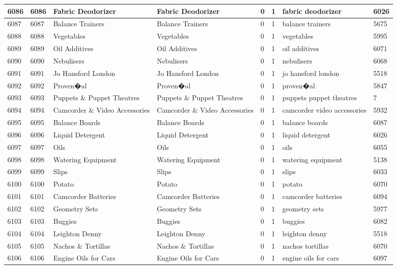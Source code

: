 \begin{longtable}{|l|l|l|l|l|l|l|l|}
6086 & 6086 & Fabric Deodorizer & Fabric Deodorizer & 0 & 1 & fabric deodorizer & 6026 \\ \hline 
6087 & 6087 & Balance Trainers & Balance Trainers & 0 & 1 & balance trainers & 5675 \\ \hline 
6088 & 6088 & Vegetables & Vegetables & 0 & 1 & vegetables & 5995 \\ \hline 
6089 & 6089 & Oil Additives & Oil Additives & 0 & 1 & oil additives & 6071 \\ \hline 
6090 & 6090 & Nebulisers & Nebulisers & 0 & 1 & nebulisers & 6068 \\ \hline 
6091 & 6091 & Jo Hansford London & Jo Hansford London & 0 & 1 & jo hansford london & 5518 \\ \hline 
6092 & 6092 & Proven�al & Proven�al & 0 & 1 & proven�al & 5847 \\ \hline 
6093 & 6093 & Puppets \& Puppet Theatres & Puppets \& Puppet Theatres & 0 & 1 & puppets puppet theatres & 7 \\ \hline 
6094 & 6094 & Camcorder \& Video Accessories & Camcorder \& Video Accessories & 0 & 1 & camcorder video accessories & 5932 \\ \hline 
6095 & 6095 & Balance Boards & Balance Boards & 0 & 1 & balance boards & 6087 \\ \hline 
6096 & 6096 & Liquid Detergent & Liquid Detergent & 0 & 1 & liquid detergent & 6026 \\ \hline 
6097 & 6097 & Oils & Oils & 0 & 1 & oils & 6055 \\ \hline 
6098 & 6098 & Watering Equipment & Watering Equipment & 0 & 1 & watering equipment & 5138 \\ \hline 
6099 & 6099 & Slips & Slips & 0 & 1 & slips & 6033 \\ \hline 
6100 & 6100 & Potato & Potato & 0 & 1 & potato & 6070 \\ \hline 
6101 & 6101 & Camcorder Batteries & Camcorder Batteries & 0 & 1 & camcorder batteries & 6094 \\ \hline 
6102 & 6102 & Geometry Sets & Geometry Sets & 0 & 1 & geometry sets & 5977 \\ \hline 
6103 & 6103 & Buggies & Buggies & 0 & 1 & buggies & 6082 \\ \hline 
6104 & 6104 & Leighton Denny & Leighton Denny & 0 & 1 & leighton denny & 5518 \\ \hline 
6105 & 6105 & Nachos \& Tortillas & Nachos \& Tortillas & 0 & 1 & nachos tortillas & 6070 \\ \hline 
6106 & 6106 & Engine Oils for Cars & Engine Oils for Cars & 0 & 1 & engine oils for cars & 6097 \\ \hline 

\end{longtable}
